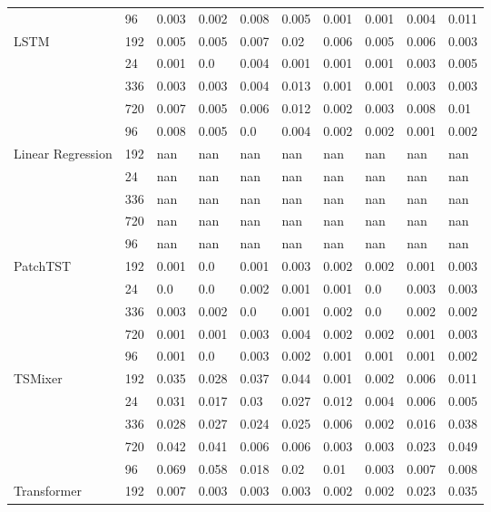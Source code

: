 \begin{tabular}{llllllllll}
 & 96 & 0.003 & 0.002 & 0.008 & 0.005 & 0.001 & 0.001 & 0.004 & 0.011 \\
\cline{1-10}
\multirow[t]{5}{*}{LSTM} & 192 & 0.005 & 0.005 & 0.007 & 0.02 & 0.006 & 0.005 & 0.006 & 0.003 \\
 & 24 & 0.001 & 0.0 & 0.004 & 0.001 & 0.001 & 0.001 & 0.003 & 0.005 \\
 & 336 & 0.003 & 0.003 & 0.004 & 0.013 & 0.001 & 0.001 & 0.003 & 0.003 \\
 & 720 & 0.007 & 0.005 & 0.006 & 0.012 & 0.002 & 0.003 & 0.008 & 0.01 \\
 & 96 & 0.008 & 0.005 & 0.0 & 0.004 & 0.002 & 0.002 & 0.001 & 0.002 \\
\cline{1-10}
\multirow[t]{5}{*}{Linear Regression} & 192 & nan & nan & nan & nan & nan & nan & nan & nan \\
 & 24 & nan & nan & nan & nan & nan & nan & nan & nan \\
 & 336 & nan & nan & nan & nan & nan & nan & nan & nan \\
 & 720 & nan & nan & nan & nan & nan & nan & nan & nan \\
 & 96 & nan & nan & nan & nan & nan & nan & nan & nan \\
\cline{1-10}
\multirow[t]{5}{*}{PatchTST} & 192 & 0.001 & 0.0 & 0.001 & 0.003 & 0.002 & 0.002 & 0.001 & 0.003 \\
 & 24 & 0.0 & 0.0 & 0.002 & 0.001 & 0.001 & 0.0 & 0.003 & 0.003 \\
 & 336 & 0.003 & 0.002 & 0.0 & 0.001 & 0.002 & 0.0 & 0.002 & 0.002 \\
 & 720 & 0.001 & 0.001 & 0.003 & 0.004 & 0.002 & 0.002 & 0.001 & 0.003 \\
 & 96 & 0.001 & 0.0 & 0.003 & 0.002 & 0.001 & 0.001 & 0.001 & 0.002 \\
\cline{1-10}
\multirow[t]{5}{*}{TSMixer} & 192 & 0.035 & 0.028 & 0.037 & 0.044 & 0.001 & 0.002 & 0.006 & 0.011 \\
 & 24 & 0.031 & 0.017 & 0.03 & 0.027 & 0.012 & 0.004 & 0.006 & 0.005 \\
 & 336 & 0.028 & 0.027 & 0.024 & 0.025 & 0.006 & 0.002 & 0.016 & 0.038 \\
 & 720 & 0.042 & 0.041 & 0.006 & 0.006 & 0.003 & 0.003 & 0.023 & 0.049 \\
 & 96 & 0.069 & 0.058 & 0.018 & 0.02 & 0.01 & 0.003 & 0.007 & 0.008 \\
\cline{1-10}
\multirow[t]{5}{*}{Transformer} & 192 & 0.007 & 0.003 & 0.003 & 0.003 & 0.002 & 0.002 & 0.023 & 0.035 \\

\end{tabular}
